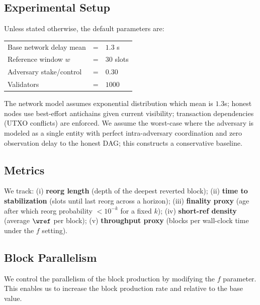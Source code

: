\subsection{Experimental Setup}
Unless stated otherwise, the default parameters are:
\begin{center}
\begin{tabular}{lcl}
\toprule
Base network delay mean & = & $1.3$ s\\
Reference window $w$ & = & $30$ slots\\
Adversary stake/control & = & $0.30$ \\
Validators & = & $1000$ \\
\bottomrule
\end{tabular}
\end{center}

The network model assumes exponential distribution which mean is $1.3$s; honest nodes use best-effort antichains given current visibility; transaction dependencies (UTXO conflicts) are enforced. We assume the worst-case where the adversary is modeled as a single entity with perfect intra-adversary coordination and zero observation delay to the honest DAG; this constructs a conservative baseline.

\subsection{Metrics}
We track: (i) \textbf{reorg length} (depth of the deepest reverted block); (ii) \textbf{time to stabilization} (slots until last reorg across a horizon); (iii) \textbf{finality proxy} (age after which reorg probability $<10^{-k}$ for a fixed $k$); (iv) \textbf{short-ref density} (average $\wref$ per block); (v) \textbf{throughput proxy} (blocks per wall-clock time under the $f$ setting). %

\subsection{Block Parallelism}
We control the parallelism of the block production by modifying the $f$ parameter. This enables us to increase the block production rate and relative to the base value.

